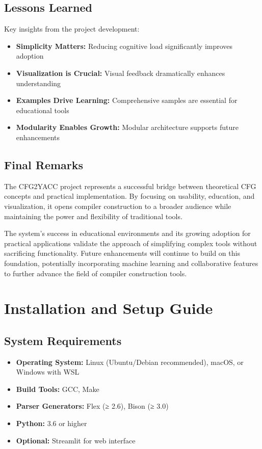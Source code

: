 \documentclass[a4paper,12pt]{report}
\begin{document}
\section{Lessons Learned}
Key insights from the project development:
\begin{itemize}
    \item \textbf{Simplicity Matters:} Reducing cognitive load significantly improves adoption
    \item \textbf{Visualization is Crucial:} Visual feedback dramatically enhances understanding
    \item \textbf{Examples Drive Learning:} Comprehensive samples are essential for educational tools
    \item \textbf{Modularity Enables Growth:} Modular architecture supports future enhancements
\end{itemize}

\section{Final Remarks}
The CFG2YACC project represents a successful bridge between theoretical CFG concepts and practical implementation. By focusing on usability, education, and visualization, it opens compiler construction to a broader audience while maintaining the power and flexibility of traditional tools.

The system's success in educational environments and its growing adoption for practical applications validate the approach of simplifying complex tools without sacrificing functionality. Future enhancements will continue to build on this foundation, potentially incorporating machine learning and collaborative features to further advance the field of compiler construction tools.


\newpage

\appendix

\chapter{Installation and Setup Guide}
\thispagestyle{contentpages}

\section{System Requirements}
\begin{itemize}
    \item \textbf{Operating System:} Linux (Ubuntu/Debian recommended), macOS, or Windows with WSL
    \item \textbf{Build Tools:} GCC, Make
    \item \textbf{Parser Generators:} Flex (≥ 2.6), Bison (≥ 3.0)
    \item \textbf{Python:} 3.6 or higher
    \item \textbf{Optional:} Streamlit for web interface
\end{itemize}
\end{document}
